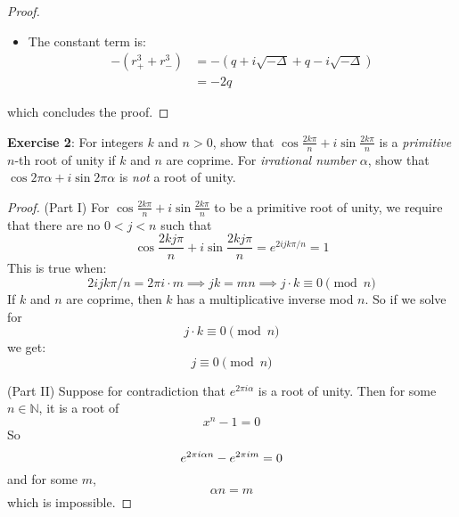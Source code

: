\documentclass{article}
\begin{document}
\begin{itemize}
\begin{proof}
\begin{itemize}
                        \item The constant term is:
                            \begin{align*}
                                -(r_{+}^{3} + r_{-}^{3}) &= -(q + i\sqrt{-\Delta} + q - i\sqrt{-\Delta}) \\
                                                         &= -2q                                            
                            \end{align*}
                    \end{itemize}
                which concludes the proof.
            \end{proof}
    \end{itemize}

\newpage

\textbf{Exercise 2}: For integers $k$ and $n > 0$, show that $\cos{\frac{2k\pi}{n}} + i \sin{\frac{2k \pi}{n}}$ is a \textit{primitive} $n$-th root of unity if $k$ and $n$ are coprime. For \textit{irrational number} $\alpha$, show that $\cos{2\pi\alpha} + i \sin{ 2\pi\alpha}$ is \textit{not} a root of unity.
    \begin{proof}
        (Part I) For $\cos{\frac{2k\pi}{n}} + i \sin{\frac{2k\pi}{n}}$ to be a primitive root of unity, we require that there are no $0 < j < n$ such that 
            \begin{equation*}
                \cos{\dfrac{2kj\pi}{n}} + i \sin{\dfrac{2kj\pi}{n}} = e^{2ijk\pi/n} = 1
            \end{equation*}
        This is true when:
            \begin{equation*}
                2ijk\pi/n = 2\pi i \cdot m \implies j k = mn \implies j \cdot k \equiv 0 \pmod{n}
            \end{equation*}
        If $k$ and $n$ are coprime, then $k$ has a multiplicative inverse mod $n$. So if we solve for 
            \begin{equation*}
                j \cdot k \equiv 0 \pmod{n}
            \end{equation*}
        we get:
            \begin{equation*}
                j \equiv 0 \pmod{n}
            \end{equation*}

        (Part II) Suppose for contradiction that $e^{2\pi i \alpha}$ is a root of unity. Then for some $n \in \mathbb{N}$, it is a root of 
            \begin{equation*}
                x^{n} - 1 = 0
            \end{equation*}
        So
            \begin{equation*}
                e^{2\pi i  \alpha n} - e^{2 \pi i m} = 0 \\
            \end{equation*}
        and for some $m$, 
            \begin{equation*}
                \alpha n = m
            \end{equation*}
        which is impossible.
    \end{proof}
\end{document}
